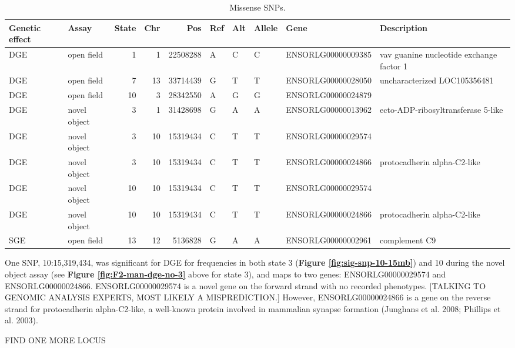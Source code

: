 \documentclass[
]{book}
\begin{document}
\begin{table}

\caption{\label{tab:F2-sig-snps-missense}Missense SNPs.}
\centering
\begin{tabular}[t]{llrrrlllll}
\toprule
Genetic effect & Assay & State & Chr & Pos & Ref & Alt & Allele & Gene & Description\\
\midrule
DGE & open field & 1 & 1 & 22508288 & A & C & C & ENSORLG00000009385 & vav guanine nucleotide exchange factor 1\\
DGE & open field & 7 & 13 & 33714439 & G & T & T & ENSORLG00000028050 & uncharacterized LOC105356481\\
DGE & open field & 10 & 3 & 28342550 & A & G & G & ENSORLG00000024879 & \\
DGE & novel object & 3 & 1 & 31428698 & G & A & A & ENSORLG00000013962 & ecto-ADP-ribosyltransferase 5-like\\
DGE & novel object & 3 & 10 & 15319434 & C & T & T & ENSORLG00000029574 & \\
\addlinespace
DGE & novel object & 3 & 10 & 15319434 & C & T & T & ENSORLG00000024866 & protocadherin alpha-C2-like\\
DGE & novel object & 10 & 10 & 15319434 & C & T & T & ENSORLG00000029574 & \\
DGE & novel object & 10 & 10 & 15319434 & C & T & T & ENSORLG00000024866 & protocadherin alpha-C2-like\\
SGE & open field & 13 & 12 & 5136828 & G & A & A & ENSORLG00000002961 & complement C9\\
\bottomrule
\end{tabular}
\end{table}

One SNP, 10:15,319,434, was significant for DGE for frequencies in both state 3 (\textbf{Figure \ref{fig:sig-snp-10-15mb}}) and 10 during the novel object assay (see \textbf{Figure \ref{fig:F2-man-dge-no-3}} above for state 3), and maps to two genes: ENSORLG00000029574 and ENSORLG00000024866. ENSORLG00000029574 is a novel gene on the forward strand with no recorded phenotypes. {[}TALKING TO GENOMIC ANALYSIS EXPERTS, MOST LIKELY A MISPREDICTION.{]} However, ENSORLG00000024866 is a gene on the reverse strand for protocadherin alpha-C2-like, a well-known protein involved in mammalian synapse formation (Junghans et al. 2008; Phillips et al. 2003).

FIND ONE MORE LOCUS
\end{document}

